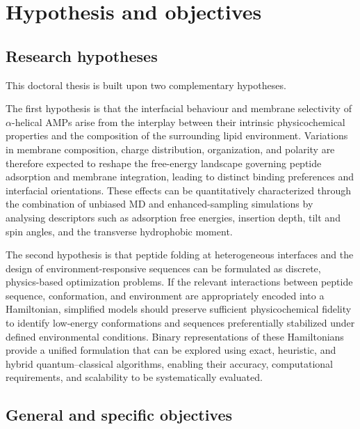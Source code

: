 \chapter{Hypothesis and objectives}\label{chap:objectives}


\newpage
\section{Research hypotheses}

This doctoral thesis is built upon two complementary hypotheses.

The first hypothesis is that the interfacial behaviour and membrane selectivity of $\alpha$-helical AMPs arise from the interplay between their intrinsic physicochemical properties and the composition of the surrounding lipid environment. Variations in membrane composition, charge distribution, organization, and polarity are therefore expected to reshape the free-energy landscape governing peptide adsorption and membrane integration, leading to distinct binding preferences and interfacial orientations. These effects can be quantitatively characterized through the combination of unbiased MD and enhanced-sampling simulations by analysing descriptors such as adsorption free energies, insertion depth, tilt and spin angles, and the transverse hydrophobic moment.

The second hypothesis is that peptide folding at heterogeneous interfaces and the design of environment-responsive sequences can be formulated as discrete, physics-based optimization problems. If the relevant interactions between peptide sequence, conformation, and environment are appropriately encoded into a Hamiltonian, simplified models should preserve sufficient physicochemical fidelity to identify low-energy conformations and sequences preferentially stabilized under defined environmental conditions. Binary representations of these Hamiltonians provide a unified formulation that can be explored using exact, heuristic, and hybrid quantum--classical algorithms, enabling their accuracy, computational requirements, and scalability to be systematically evaluated.

\section{General and specific objectives}

